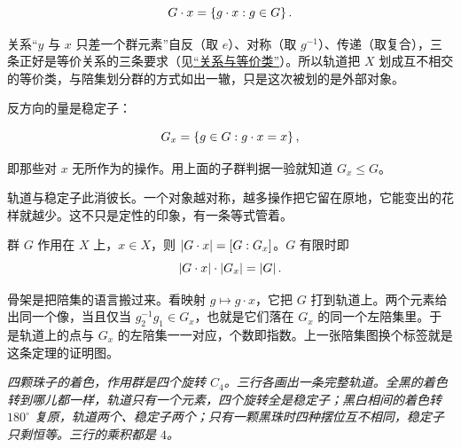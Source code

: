 \[
G\cdot x=\left\{g\cdot x:g\in G\right\}.
\]

关系``\(y\) 与 \(x\) 只差一个群元素''自反（取 \(e\)）、对称（取 \(g^{-1}\)）、传递（取复合），三条正好是等价关系的三条要求（见\hyperref[sec:01-Mathematical-Language/02-Sets-Relations-Functions/02]{``关系与等价类''}）。所以轨道把 \(X\) 划成互不相交的等价类，与陪集划分群的方式如出一辙，只是这次被划的是外部对象。

反方向的量是稳定子：

\[
G_x=\left\{g\in G:g\cdot x=x\right\},
\]

即那些对 \(x\) 无所作为的操作。用上面的子群判据一验就知道 \(G_x\le G\)。

轨道与稳定子此消彼长。一个对象越对称，越多操作把它留在原地，它能变出的花样就越少。这不只是定性的印象，有一条等式管着。

\begin{theorem}[轨道--稳定子]
群 \(G\) 作用在 \(X\) 上，\(x\in X\)，则 \(\left|G\cdot x\right|=[G:G_x]\)。\(G\) 有限时即
\[
\left|G\cdot x\right|\cdot\left|G_x\right|=\left|G\right|.
\]
\end{theorem}

骨架是把陪集的语言搬过来。看映射 \(g\mapsto g\cdot x\)，它把 \(G\) 打到轨道上。两个元素给出同一个像，当且仅当 \(g_2^{-1}g_1\in G_x\)，也就是它们落在 \(G_x\) 的同一个左陪集里。于是轨道上的点与 \(G_x\) 的左陪集一一对应，个数即指数。上一张陪集图换个标签就是这条定理的证明图。

\begin{center}

\emph{四颗珠子的着色，作用群是四个旋转 \(C_4\)。三行各画出一条完整轨道。全黑的着色转到哪儿都一样，轨道只有一个元素，四个旋转全是稳定子；黑白相间的着色转 \(180^\circ\) 复原，轨道两个、稳定子两个；只有一颗黑珠时四种摆位互不相同，稳定子只剩恒等。三行的乘积都是 \(4\)。}
\end{center}

